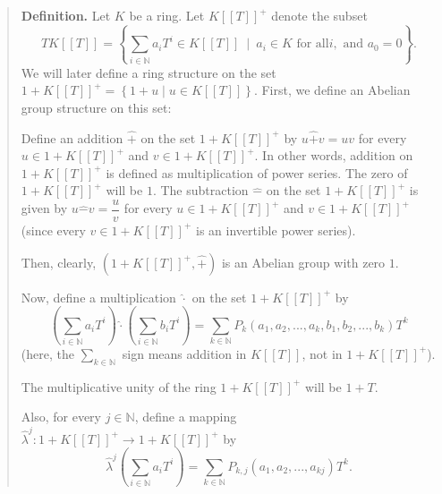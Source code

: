 \documentclass[12pt,final,notitlepage,onecolumn,german]{article}%
\begin{document}
\begin{quote}
\textbf{Definition.} Let $K$ be a ring. Let $K\left[  \left[  T\right]
\right]  ^{+}$ denote the subset%
\[
TK\left[  \left[  T\right]  \right]  =\left\{  \sum_{i\in\mathbb{N}}a_{i}%
T^{i}\in K\left[  \left[  T\right]  \right]  \ \mid\ a_{i}\in K\text{ for all
}i,\text{ and }a_{0}=0\right\}  .
\]
We will later define a ring structure on the set $1+K\left[  \left[  T\right]
\right]  ^{+}=\left\{  1+u\mid u\in K\left[  \left[  T\right]  \right]
\right\}  $. First, we define an Abelian group structure on this set:

Define an addition $\widehat{+}$ on the set $1+K\left[  \left[  T\right]
\right]  ^{+}$ by $u\widehat{+}v=uv$ for every $u\in1+K\left[  \left[
T\right]  \right]  ^{+}$ and $v\in1+K\left[  \left[  T\right]  \right]  ^{+}$.
In other words, addition on $1+K\left[  \left[  T\right]  \right]  ^{+}$ is
defined as multiplication of power series. The zero of $1+K\left[  \left[
T\right]  \right]  ^{+}$ will be $1$. The subtraction $\widehat{-}$ on the set
$1+K\left[  \left[  T\right]  \right]  ^{+}$ is given by $u\widehat{-}%
v=\dfrac{u}{v}$ for every $u\in1+K\left[  \left[  T\right]  \right]  ^{+}$ and
$v\in1+K\left[  \left[  T\right]  \right]  ^{+}$ (since every $v\in1+K\left[
\left[  T\right]  \right]  ^{+}$ is an invertible power series).

Then, clearly, $\left(  1+K\left[  \left[  T\right]  \right]  ^{+},\widehat
{+}\right)  $ is an Abelian group with zero $1$.

Now, define a multiplication $\widehat{\cdot}$ on the set $1+K\left[  \left[
T\right]  \right]  ^{+}$ by%
\[
\left(  \sum_{i\in\mathbb{N}}a_{i}T^{i}\right)  \widehat{\cdot}\left(
\sum_{i\in\mathbb{N}}b_{i}T^{i}\right)  =\sum_{k\in\mathbb{N}}P_{k}\left(
a_{1},a_{2},...,a_{k},b_{1},b_{2},...,b_{k}\right)  T^{k}%
\]
(here, the $\sum\limits_{k\in\mathbb{N}}$ sign means addition in $K\left[
\left[  T\right]  \right]  $, not in $1+K\left[  \left[  T\right]  \right]
^{+}$).

The multiplicative unity of the ring $1+K\left[  \left[  T\right]  \right]
^{+}$ will be $1+T$.

Also, for every $j\in\mathbb{N}$, define a mapping $\widehat{\lambda}%
^{j}:1+K\left[  \left[  T\right]  \right]  ^{+}\rightarrow1+K\left[  \left[
T\right]  \right]  ^{+}$ by%
\[
\widehat{\lambda}^{j}\left(  \sum_{i\in\mathbb{N}}a_{i}T^{i}\right)
=\sum_{k\in\mathbb{N}}P_{k,j}\left(  a_{1},a_{2},...,a_{kj}\right)  T^{k}.
\]



\end{quote}
\end{document}
